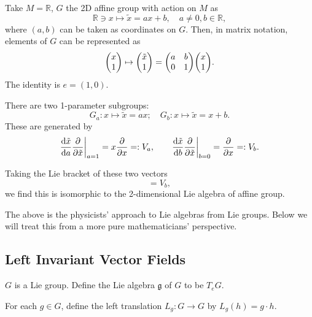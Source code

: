 \documentclass[a4paper,11pt]{article}
\begin{document}
    \begin{ex}
        Take $M = \mathbb{R}$, $G$ the 2D affine group with action on $M$ as 
        \begin{equation}
            \mathbb{R} \ni x \mapsto \tilde x = a x + b, \quad a \neq 0, b \in \mathbb{R},
        \end{equation}
        where $(a,b)$ can be taken as coordinates on $G$. Then, in matrix notation, elements of $G$ can be represented as 
        \begin{equation}
            \mqty(x\\1) \mapsto \mqty(\tilde x\\1) = \mqty(a & b\\0 & 1)\mqty(x\\1).
        \end{equation}
        The identity is $e = (1,0)$. 

        There are two 1-parameter subgroups: 
        \begin{equation}
            G_a : x \mapsto \tilde x = ax; \quad G_b : x \mapsto \tilde x = x + b.
        \end{equation}
        These are generated by 
        \begin{equation}
            \dv{\tilde x}{a} \pdv{\tilde x}\bigg|_{a=1} = x \pdv{x} =: V_a, \qquad \dv{\tilde x}{b} \pdv{\tilde x}\bigg|_{b=0} = \pdv{x} =: V_b.
        \end{equation}
        
        Taking the Lie bracket of these two vectors 
        \begin{equation}
            [V_b, V_a] = V_b,
        \end{equation}
        we find this is isomorphic to the 2-dimensional Lie algebra of affine group. 
    \end{ex}
    The above is the physicists' approach to Lie algebras from Lie groups. Below we will treat this from a more pure mathematicians' perspective.
    \newpage

    \subsection{Left Invariant Vector Fields}
    \begin{defi}
        $G$ is a Lie group. Define the Lie algebra $\mathfrak{g}$ of $G$ to be $T_e G$.
    \end{defi}
    \begin{defi}
        For each $g \in G$, define the left translation $L_g: G \to G$ by $L_g(h) = g \cdot h$.
    \end{defi}
    
\end{document}
